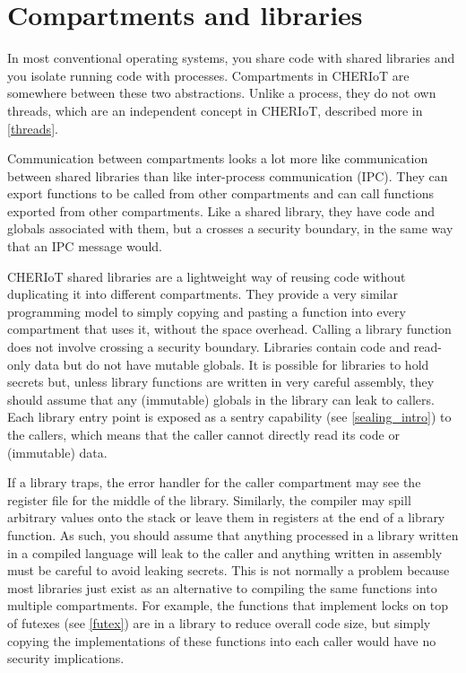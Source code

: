 \chapter[label=compartments]{Compartments and libraries}

In most conventional operating systems, you share code with shared libraries and you isolate running code with processes.
Compartments in CHERIoT are somewhere between these two abstractions.
Unlike a process, they do not own threads, which are an independent concept in CHERIoT, described more in \ref{threads}.

Communication between compartments looks a lot more like communication between shared libraries than like inter-process communication (IPC).
They can export functions to be called from other compartments and can call functions exported from other compartments.
Like a shared library, they have code and globals associated with them, but a  crosses a security boundary, in the same way that an IPC message would.

CHERIoT shared libraries are a lightweight way of reusing code without duplicating it into different compartments.
They provide a very similar programming model to simply copying and pasting a function into every compartment that uses it, without the space overhead.
Calling a library function does not involve crossing a security boundary.
Libraries contain code and read-only data but do not have mutable globals.
It is possible for libraries to hold secrets but, unless library functions are written in very careful assembly, they should assume that any (immutable) globals in the library can leak to callers.
Each library entry point is exposed as a sentry capability (see \ref{sealing_intro}) to the callers, which means that the caller cannot directly read its code or (immutable) data.

\begin{warning}
If a library traps, the error handler for the caller compartment may see the register file for the middle of the library.
Similarly, the compiler may spill arbitrary values onto the stack or leave them in registers at the end of a library function.
As such, you should assume that anything processed in a library written in a compiled language will leak to the caller and anything written in assembly must be  careful to avoid leaking secrets.
This is not normally a problem because most libraries just exist as an alternative to compiling the same functions into multiple compartments.
For example, the functions that implement locks on top of futexes (see \ref{futex}) are in a library to reduce overall code size, but simply copying the implementations of these functions into each caller would have no security implications.
\end{warning}

